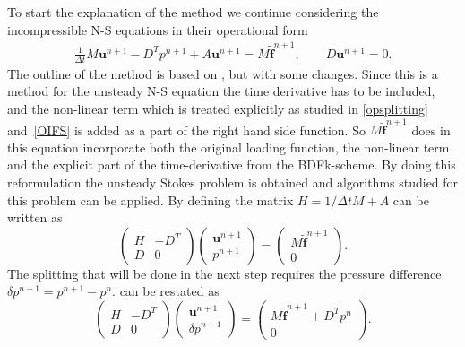 To start the explanation of the method we continue considering the incompressible N-S equations in their 
operational form 
\begin{align}
    \frac{1}{\Delta t} M \mathbf{u}^{n+1}-D^Tp^{n+1}+A \mathbf{u}^{n+1} = M\mathbf{\tilde f}^{n+1},
    \qquad D\mathbf{u}^{n+1}    = 0.
    \label{eq:DiscreteStart}
\end{align}
The outline of the method is based on , but with some changes. Since this 
is a method for the unsteady N-S equation the time derivative has to be included, and the 
non-linear term which is treated explicitly as studied in \cref{opsplitting} and~\ref{OIFS}
is added as a part of the right hand side function. So $M\mathbf{\tilde f}^{n+1}$ does in this equation 
incorporate both the original loading function, the non-linear term and the explicit part of the 
time-derivative from the BDFk-scheme. 
By doing this reformulation the unsteady Stokes problem is obtained and algorithms studied 
for this problem can be applied.
By defining the matrix $H = 1/\Delta t M + A$  
can be written as 
\begin{equation}
\begin{pmatrix}
    H & -D^T \\ 
    D & 0
\end{pmatrix}
\begin{pmatrix}
    \mathbf{u}^{n+1}  \\ 
    p^{n+1} 
\end{pmatrix}
=
\begin{pmatrix}
    M\mathbf{\tilde f}^{n+1}  \\ 
    0 
    \end{pmatrix}.
    \label{eq:Matform}
\end{equation}
The splitting that will be done in the next step requires the 
pressure difference $\delta p^{n+1} = p^{n+1}-p^n$.  can be restated as 
\begin{equation}
\begin{pmatrix}
    H & -D^T \\ 
    D & 0
\end{pmatrix}
\begin{pmatrix}
    \mathbf{u}^{n+1}  \\ 
    \delta p^{n+1} 
\end{pmatrix}
=
\begin{pmatrix}
    M\mathbf{\tilde f}^{n+1} +D^Tp^n  \\ 
    0 
    \end{pmatrix}.
    \label{eq:Matform}
\end{equation}

